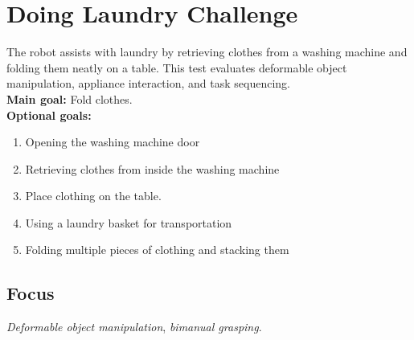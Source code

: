 \section{Doing Laundry Challenge}\label{test:doing-laundry}
The robot assists with laundry by retrieving clothes from a washing machine and folding them neatly on a table. This test evaluates deformable object manipulation, appliance interaction, and task sequencing.\\

\noindent \textbf{Main goal:} Fold clothes.\\

\noindent \textbf{Optional goals:}
\begin{enumerate}[nosep]
    \item Opening the washing machine door
    \item Retrieving clothes from inside the washing machine
    \item Place clothing on the table.
    \item Using a laundry basket for transportation
    \item Folding multiple pieces of clothing and stacking them
\end{enumerate}

\subsection*{Focus}
\emph{Deformable object manipulation}, \emph{bimanual grasping}.

